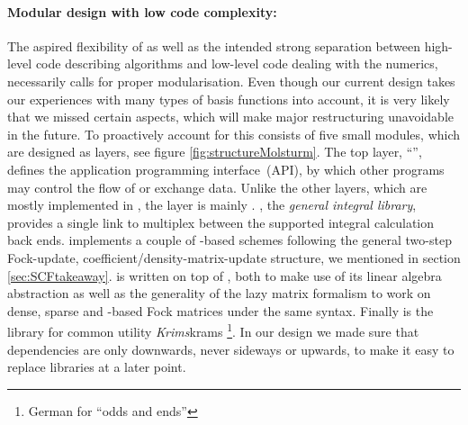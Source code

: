 \paragraph{Modular design with low code complexity:}
The aspired flexibility of \molsturm as well as the intended
strong separation between high-level code describing algorithms
and low-level code dealing with the numerics,
necessarily calls for proper modularisation.
Even though our current design takes our experiences with many types
of basis functions into account,
it is very likely that we missed certain aspects,
which will make major restructuring unavoidable in the future.
To proactively account for this \molsturm consists of five small modules,
which are designed as layers, see figure \vref{fig:structureMolsturm}.
The top layer, ``\molsturm'', defines the application programming interface~(API),
by which other programs may control the flow of \molsturm or exchange data.
Unlike the other layers, which are mostly implemented in \cpp,
the \molsturm layer is mainly \python.
\gint, the \textit{general integral library},
provides a single link to multiplex between the supported integral calculation back ends.
\gscf implements a couple of \contraction-based \SCF schemes
following the general two-step Fock-update, coefficient/density-matrix-update structure,
we mentioned in section \ref{sec:SCFtakeaway}.
\gscf is written on top of \lazyten,
both to make use of its linear algebra abstraction
as well as the generality of the lazy matrix formalism
to work on dense, sparse and \contraction-based Fock matrices
under the same syntax.
Finally \krims is the library for common utility \textit{Krims}krams%
\footnote{German for ``odds and ends''}.
In our design we made sure
that dependencies are only downwards, never sideways or upwards,
to make it easy to replace libraries at a later point.
%
%
